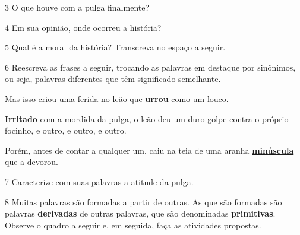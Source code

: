 \num{3} O que houve com a pulga finalmente?


\num{4} Em sua opinião, onde ocorreu a história?


\num{5} Qual é a moral da história? Transcreva no espaço a seguir.


\num{6} Reescreva as frases a seguir, trocando as palavras em destaque por
sinônimos, ou seja, palavras diferentes que têm significado
semelhante.


\begin{escolha}[itemsep=-5pt]
\item Mas isso criou uma ferida no leão que \textbf{\underline{urrou}} como um louco.


\item \textbf{\underline{Irritado}} com a mordida da pulga, o leão deu um duro golpe contra o próprio focinho, e outro, e outro, e outro.


\item Porém, antes de contar a qualquer um, caiu na teia de uma aranha \textbf{\underline{minúscula}} que a devorou.

\end{escolha}

\num{7} Caracterize com suas palavras a atitude da pulga.


\num{8} Muitas palavras são formadas a partir de outras. As que são formadas são
palavras \textbf{derivadas} de outras palavras, que são denominadas
\textbf{primitivas}. Observe o quadro a seguir e, em seguida, faça as
atividades propostas.

